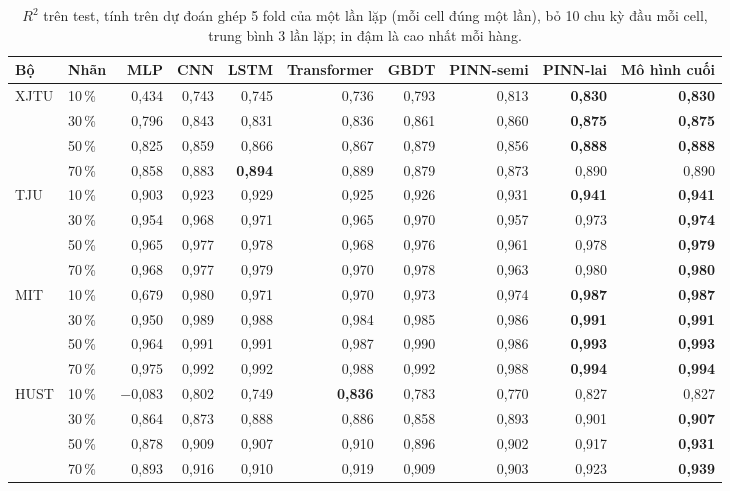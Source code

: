 \documentclass[12pt,a4paper,oneside]{report}
\theoremstyle{plain}
\theoremstyle{definition}
\begin{document}
\begin{table}[!htbp]\centering\footnotesize
\caption[$R^2$ của mọi mô hình chính]{$R^2$ trên test, tính trên dự đoán ghép 5 fold của một lần lặp (mỗi cell đúng một lần), bỏ 10 chu kỳ đầu mỗi cell, trung bình 3 lần lặp; in đậm là cao nhất mỗi hàng.}\label{tab:allr2}
\begin{adjustbox}{max width=\textwidth}\begin{tabular}{llrrrrrrrr}\toprule
Bộ & Nhãn & MLP & CNN & LSTM & Transformer & GBDT & PINN-semi & PINN-lai & Mô hình cuối \\\midrule
XJTU & 10\,\% & 0{,}434 & 0{,}743 & 0{,}745 & 0{,}736 & 0{,}793 & 0{,}813 & \textbf{0{,}830} & \textbf{0{,}830} \\
 & 30\,\% & 0{,}796 & 0{,}843 & 0{,}831 & 0{,}836 & 0{,}861 & 0{,}860 & \textbf{0{,}875} & \textbf{0{,}875} \\
 & 50\,\% & 0{,}825 & 0{,}859 & 0{,}866 & 0{,}867 & 0{,}879 & 0{,}856 & \textbf{0{,}888} & \textbf{0{,}888} \\
 & 70\,\% & 0{,}858 & 0{,}883 & \textbf{0{,}894} & 0{,}889 & 0{,}879 & 0{,}873 & 0{,}890 & 0{,}890 \\
TJU & 10\,\% & 0{,}903 & 0{,}923 & 0{,}929 & 0{,}925 & 0{,}926 & 0{,}931 & \textbf{0{,}941} & \textbf{0{,}941} \\
 & 30\,\% & 0{,}954 & 0{,}968 & 0{,}971 & 0{,}965 & 0{,}970 & 0{,}957 & 0{,}973 & \textbf{0{,}974} \\
 & 50\,\% & 0{,}965 & 0{,}977 & 0{,}978 & 0{,}968 & 0{,}976 & 0{,}961 & 0{,}978 & \textbf{0{,}979} \\
 & 70\,\% & 0{,}968 & 0{,}977 & 0{,}979 & 0{,}970 & 0{,}978 & 0{,}963 & 0{,}980 & \textbf{0{,}980} \\
MIT & 10\,\% & 0{,}679 & 0{,}980 & 0{,}971 & 0{,}970 & 0{,}973 & 0{,}974 & \textbf{0{,}987} & \textbf{0{,}987} \\
 & 30\,\% & 0{,}950 & 0{,}989 & 0{,}988 & 0{,}984 & 0{,}985 & 0{,}986 & \textbf{0{,}991} & \textbf{0{,}991} \\
 & 50\,\% & 0{,}964 & 0{,}991 & 0{,}991 & 0{,}987 & 0{,}990 & 0{,}986 & \textbf{0{,}993} & \textbf{0{,}993} \\
 & 70\,\% & 0{,}975 & 0{,}992 & 0{,}992 & 0{,}988 & 0{,}992 & 0{,}988 & \textbf{0{,}994} & \textbf{0{,}994} \\
HUST & 10\,\% & −0{,}083 & 0{,}802 & 0{,}749 & \textbf{0{,}836} & 0{,}783 & 0{,}770 & 0{,}827 & 0{,}827 \\
 & 30\,\% & 0{,}864 & 0{,}873 & 0{,}888 & 0{,}886 & 0{,}858 & 0{,}893 & 0{,}901 & \textbf{0{,}907} \\
 & 50\,\% & 0{,}878 & 0{,}909 & 0{,}907 & 0{,}910 & 0{,}896 & 0{,}902 & 0{,}917 & \textbf{0{,}931} \\
 & 70\,\% & 0{,}893 & 0{,}916 & 0{,}910 & 0{,}919 & 0{,}909 & 0{,}903 & 0{,}923 & \textbf{0{,}939} \\
\bottomrule\end{tabular}\end{adjustbox}\end{table}
\end{document}
